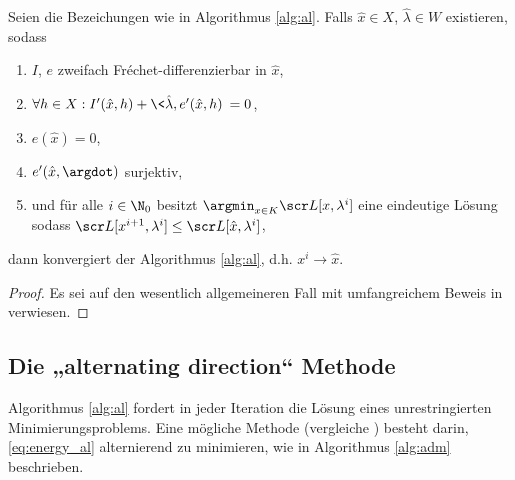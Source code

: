 \documentclass{mythesis}
\begin{document}
\begin{theorem} \label{theorem:al_convergence}
    Seien die Bezeichungen wie in Algorithmus \ref{alg:al}.
    Falls $\hat x \in X$, $\hat \lambda \in W$ existieren, sodass
    \begin{enumerate}[1)]
        \item
	    $I$, $e$ zweifach Fréchet-differenzierbar in $\hat x$,
	\item
	    $\forall h \in X: I'(\hat x,h) + \<\hat\lambda, e'(\hat x,h)\> = 0$,
	\item
	    $e(\hat x) = 0$,
	\item
	    $e'(\hat x, \argdot)$ surjektiv,
	\item
	    und für alle $i \in \N_0$ besitzt $\argmin_{x\in K} \scr L[x,\lambda^i]$ eine eindeutige Lösung sodass
	    $\scr L[x^{i+1}, \lambda^i] \le \scr L[\hat x, \lambda^i]$,
    \end{enumerate}
    dann konvergiert der Algorithmus \ref{alg:al}, d.h. $x^i \to \hat x$.
    \begin{proof}
        Es sei auf den wesentlich allgemeineren Fall mit umfangreichem Beweis in \cite[§3]{ito2008lagrange} verwiesen.
    \end{proof}
\end{theorem}




\subsection*{Die „alternating direction“ Methode}

Algorithmus \ref{alg:al} fordert in jeder Iteration die Lösung eines unrestringierten Minimierungsproblems.
Eine mögliche Methode (vergleiche \cite{brito2010fast,duan2013fast,hahn2011fast,tai2011fast,yashtini2015alternating}) besteht darin, \eqref{eq:energy_al} alternierend zu minimieren, wie in Algorithmus \ref{alg:adm} beschrieben.
\end{document}
